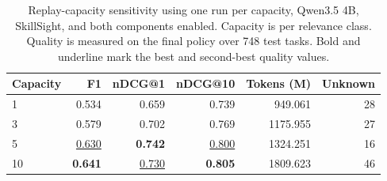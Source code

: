 \begin{table}[t]
\centering
\small
\begin{tabular}{lrrrrr}
\toprule
Capacity & F1 & nDCG@1 & nDCG@10 & Tokens (M) & Unknown \\
\midrule
1 & 0.534 & 0.659 & 0.739 & 949.061 & 28 \\
3 & 0.579 & 0.702 & 0.769 & 1175.955 & 27 \\
5 & \underline{0.630} & \textbf{0.742} & \underline{0.800} & 1324.251 & 16 \\
10 & \textbf{0.641} & \underline{0.730} & \textbf{0.805} & 1809.623 & 46 \\
\bottomrule
\end{tabular}
\caption{Replay-capacity sensitivity using one run per capacity, Qwen3.5 4B, SkillSight, and both components enabled. Capacity is per relevance class. Quality is measured on the final policy over 748 test tasks. Bold and underline mark the best and second-best quality values.}
\label{tab:app-replay-capacity}
\end{table}
